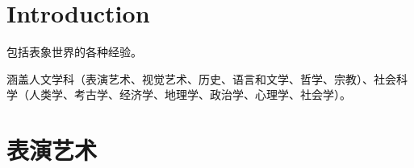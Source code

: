 

\chapter{Introduction}

包括表象世界的各种经验。

涵盖人文学科（表演艺术、视觉艺术、历史、语言和文学、哲学、宗教）、社会科学（人类学、考古学、经济学、地理学、政治学、心理学、社会学）。


\chapter{表演艺术}

